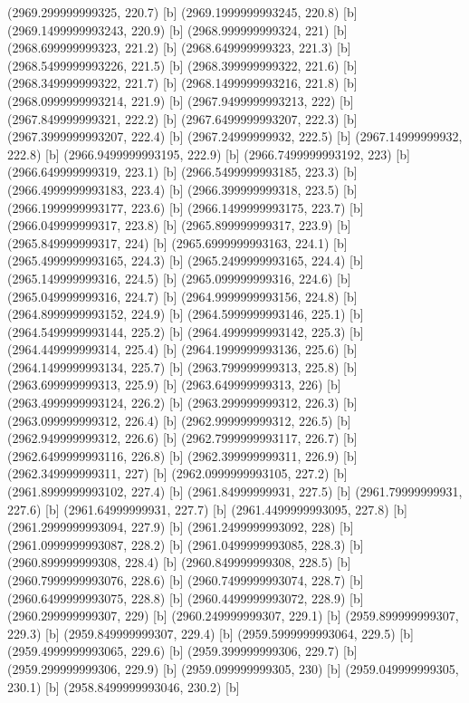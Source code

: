 {{{(2969.299999999325, 220.7) [b] 
(2969.1999999993245, 220.8) [b] 
(2969.1499999993243, 220.9) [b] 
(2968.999999999324, 221) [b] 
(2968.699999999323, 221.2) [b] 
(2968.649999999323, 221.3) [b] 
(2968.5499999993226, 221.5) [b] 
(2968.399999999322, 221.6) [b] 
(2968.349999999322, 221.7) [b] 
(2968.1499999993216, 221.8) [b] 
(2968.0999999993214, 221.9) [b] 
(2967.9499999993213, 222) [b] 
(2967.849999999321, 222.2) [b] 
(2967.6499999993207, 222.3) [b] 
(2967.3999999993207, 222.4) [b] 
(2967.24999999932, 222.5) [b] 
(2967.14999999932, 222.8) [b] 
(2966.9499999993195, 222.9) [b] 
(2966.7499999993192, 223) [b] 
(2966.649999999319, 223.1) [b] 
(2966.5499999993185, 223.3) [b] 
(2966.4999999993183, 223.4) [b] 
(2966.399999999318, 223.5) [b] 
(2966.1999999993177, 223.6) [b] 
(2966.1499999993175, 223.7) [b] 
(2966.049999999317, 223.8) [b] 
(2965.899999999317, 223.9) [b] 
(2965.849999999317, 224) [b] 
(2965.6999999993163, 224.1) [b] 
(2965.4999999993165, 224.3) [b] 
(2965.2499999993165, 224.4) [b] 
(2965.149999999316, 224.5) [b] 
(2965.099999999316, 224.6) [b] 
(2965.049999999316, 224.7) [b] 
(2964.9999999993156, 224.8) [b] 
(2964.8999999993152, 224.9) [b] 
(2964.5999999993146, 225.1) [b] 
(2964.5499999993144, 225.2) [b] 
(2964.4999999993142, 225.3) [b] 
(2964.449999999314, 225.4) [b] 
(2964.1999999993136, 225.6) [b] 
(2964.1499999993134, 225.7) [b] 
(2963.799999999313, 225.8) [b] 
(2963.699999999313, 225.9) [b] 
(2963.649999999313, 226) [b] 
(2963.4999999993124, 226.2) [b] 
(2963.299999999312, 226.3) [b] 
(2963.099999999312, 226.4) [b] 
(2962.999999999312, 226.5) [b] 
(2962.949999999312, 226.6) [b] 
(2962.7999999993117, 226.7) [b] 
(2962.6499999993116, 226.8) [b] 
(2962.399999999311, 226.9) [b] 
(2962.349999999311, 227) [b] 
(2962.0999999993105, 227.2) [b] 
(2961.8999999993102, 227.4) [b] 
(2961.84999999931, 227.5) [b] 
(2961.79999999931, 227.6) [b] 
(2961.64999999931, 227.7) [b] 
(2961.4499999993095, 227.8) [b] 
(2961.2999999993094, 227.9) [b] 
(2961.2499999993092, 228) [b] 
(2961.0999999993087, 228.2) [b] 
(2961.0499999993085, 228.3) [b] 
(2960.899999999308, 228.4) [b] 
(2960.849999999308, 228.5) [b] 
(2960.7999999993076, 228.6) [b] 
(2960.7499999993074, 228.7) [b] 
(2960.6499999993075, 228.8) [b] 
(2960.4499999993072, 228.9) [b] 
(2960.299999999307, 229) [b] 
(2960.249999999307, 229.1) [b] 
(2959.899999999307, 229.3) [b] 
(2959.849999999307, 229.4) [b] 
(2959.5999999993064, 229.5) [b] 
(2959.4999999993065, 229.6) [b] 
(2959.399999999306, 229.7) [b] 
(2959.299999999306, 229.9) [b] 
(2959.099999999305, 230) [b] 
(2959.049999999305, 230.1) [b] 
(2958.8499999993046, 230.2) [b] 
}}}
